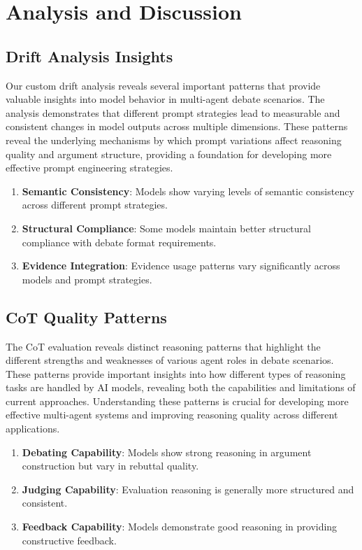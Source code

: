 \documentclass[11pt]{article}
\begin{document}
\section{Analysis and Discussion}

\subsection{Drift Analysis Insights}

Our custom drift analysis reveals several important patterns that provide valuable insights into model behavior in multi-agent debate scenarios. The analysis demonstrates that different prompt strategies lead to measurable and consistent changes in model outputs across multiple dimensions. These patterns reveal the underlying mechanisms by which prompt variations affect reasoning quality and argument structure, providing a foundation for developing more effective prompt engineering strategies.

\begin{enumerate}
    \item \textbf{Semantic Consistency}: Models show varying levels of semantic consistency across different prompt strategies.
    \item \textbf{Structural Compliance}: Some models maintain better structural compliance with debate format requirements.
    \item \textbf{Evidence Integration}: Evidence usage patterns vary significantly across models and prompt strategies.
\end{enumerate}

\subsection{CoT Quality Patterns}

The CoT evaluation reveals distinct reasoning patterns that highlight the different strengths and weaknesses of various agent roles in debate scenarios. These patterns provide important insights into how different types of reasoning tasks are handled by AI models, revealing both the capabilities and limitations of current approaches. Understanding these patterns is crucial for developing more effective multi-agent systems and improving reasoning quality across different applications.

\begin{enumerate}
    \item \textbf{Debating Capability}: Models show strong reasoning in argument construction but vary in rebuttal quality.
    \item \textbf{Judging Capability}: Evaluation reasoning is generally more structured and consistent.
    \item \textbf{Feedback Capability}: Models demonstrate good reasoning in providing constructive feedback.
\end{enumerate}
\end{document}
